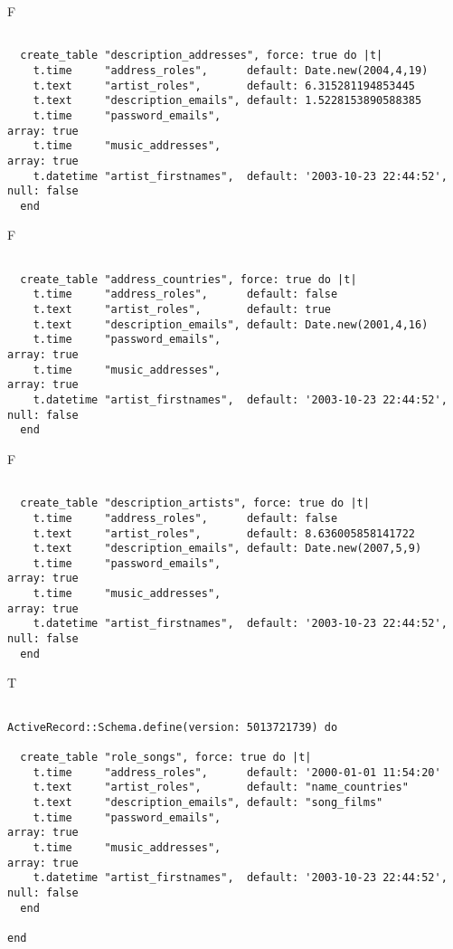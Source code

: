 F
\begin{verbatim}

  create_table "description_addresses", force: true do |t|
    t.time     "address_roles",      default: Date.new(2004,4,19)
    t.text     "artist_roles",       default: 6.315281194853445
    t.text     "description_emails", default: 1.5228153890588385
    t.time     "password_emails",                                                 array: true
    t.time     "music_addresses",                                                 array: true
    t.datetime "artist_firstnames",  default: '2003-10-23 22:44:52', null: false
  end

\end{verbatim}

F
\begin{verbatim}

  create_table "address_countries", force: true do |t|
    t.time     "address_roles",      default: false
    t.text     "artist_roles",       default: true
    t.text     "description_emails", default: Date.new(2001,4,16)
    t.time     "password_emails",                                                 array: true
    t.time     "music_addresses",                                                 array: true
    t.datetime "artist_firstnames",  default: '2003-10-23 22:44:52', null: false
  end

\end{verbatim}

F
\begin{verbatim}

  create_table "description_artists", force: true do |t|
    t.time     "address_roles",      default: false
    t.text     "artist_roles",       default: 8.636005858141722
    t.text     "description_emails", default: Date.new(2007,5,9)
    t.time     "password_emails",                                                 array: true
    t.time     "music_addresses",                                                 array: true
    t.datetime "artist_firstnames",  default: '2003-10-23 22:44:52', null: false
  end

\end{verbatim}

T
\begin{verbatim}

ActiveRecord::Schema.define(version: 5013721739) do

  create_table "role_songs", force: true do |t|
    t.time     "address_roles",      default: '2000-01-01 11:54:20'
    t.text     "artist_roles",       default: "name_countries"
    t.text     "description_emails", default: "song_films"
    t.time     "password_emails",                                                 array: true
    t.time     "music_addresses",                                                 array: true
    t.datetime "artist_firstnames",  default: '2003-10-23 22:44:52', null: false
  end

end
\end{verbatim}


